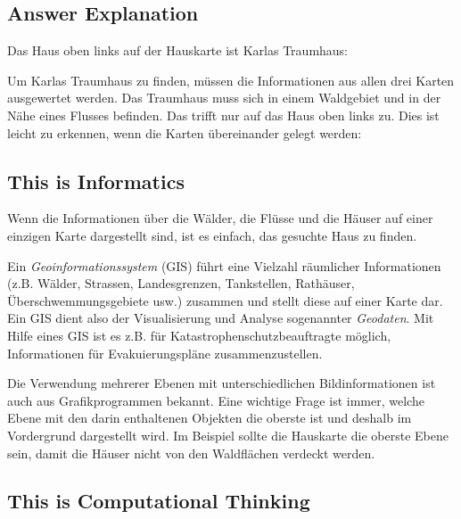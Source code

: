 \documentclass[a4paper,11pt]{report}
\newcommand{\taskGraphicsFolder}{..}
\begin{document}
\endgroup

\subsection*{Answer Explanation}

Das Haus oben links auf der Hauskarte ist Karlas Traumhaus:

{\centering%
\par}

Um Karlas Traumhaus zu finden, müssen die Informationen aus allen drei Karten ausgewertet werden. Das Traumhaus muss sich in einem Waldgebiet und in der Nähe eines Flusses befinden.  Das trifft nur auf das Haus oben links zu. Dies ist leicht zu erkennen, wenn die Karten übereinander gelegt werden:

{\centering%
\par}


\subsection*{This is Informatics}

Wenn die Informationen über die Wälder, die Flüsse und die Häuser auf einer einzigen Karte dargestellt sind, ist es einfach, das gesuchte Haus zu finden.

Ein \emph{Geoinformationssystem} (GIS) führt eine Vielzahl räumlicher Informationen (z.B. Wälder, Strassen, Landesgrenzen, Tankstellen, Rathäuser, Überschwemmungsgebiete usw.) zusammen und stellt diese auf einer Karte dar. Ein GIS dient also der Visualisierung und Analyse sogenannter \emph{Geodaten}. Mit Hilfe eines GIS ist es z.B. für Katastrophenschutzbeauftragte möglich, Informationen für Evakuierungspläne zusammenzustellen.

Die Verwendung mehrerer Ebenen mit unterschiedlichen Bildinformationen ist auch aus Grafikprogrammen bekannt. Eine wichtige Frage ist immer, welche Ebene mit den darin enthaltenen Objekten die oberste ist und deshalb im Vordergrund dargestellt wird. Im Beispiel sollte die Hauskarte die oberste Ebene sein, damit die Häuser nicht von den Waldflächen verdeckt werden.


\subsection*{This is Computational Thinking}
\end{document}
